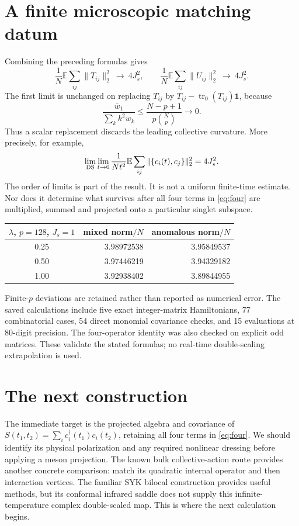 \documentclass[11pt,a4paper]{article}
\newcommand{\trn}{\operatorname{tr}_0}
\newcommand{\EE}{\mathbb E}
\begin{document}
\newpage
\section{A finite microscopic matching datum}
Combining the preceding formulas gives
\begin{equation}\label{eq:limits}
 \frac1N\EE\sum_{ij}\|T_{ij}\|_2^2\ \longrightarrow\ 4J_s^2,
 \qquad
 \frac1N\EE\sum_{ij}\|U_{ij}\|_2^2\ \longrightarrow\ 4J_s^2.
\end{equation}
The first limit is unchanged on replacing $T_{ij}$ by
$T_{ij}-\trn(T_{ij})\mathbf1$, because
\begin{equation}
 \frac{\overline w_1}{\sum_k k^2\overline w_k}
 \leq\frac{N-p+1}{p\binom Np}\longrightarrow0.
\end{equation}
Thus a scalar replacement discards the leading collective curvature.
More precisely, for example,
\begin{equation}
 \lim_{\rm DS}\lim_{t\to0}\frac1{Nt^2}
 \EE\sum_{ij}\|\{c_i(t),c_j\}\|_2^2=4J_s^2.
\end{equation}
The order of limits is part of the result. It is not a uniform
finite-time estimate. Nor does it determine what survives after all
four terms in \eqref{eq:four} are multiplied, summed and projected
onto a particular singlet subspace.

\begin{center}
\begin{tabular}{crr}
\toprule
$\lambda$, $p=128$, $J_s=1$ & mixed norm$/N$ & anomalous norm$/N$\\
\midrule
0.25 & 3.98972538 & 3.95849537\\
0.50 & 3.97446219 & 3.94329182\\
1.00 & 3.92938402 & 3.89844955\\
\bottomrule
\end{tabular}
\end{center}
Finite-$p$ deviations are retained rather than reported as numerical
error. The saved calculations include five exact integer-matrix
Hamiltonians, 77 combinatorial cases, 54 direct monomial covariance
checks, and 15 evaluations at 80-digit precision. The four-operator
identity was also checked on explicit odd matrices. These validate
the stated formulas; no real-time double-scaling extrapolation is used.

\section{The next construction}
The immediate target is the projected algebra and covariance of
$S(t_1,t_2)=\sum_i c_i^\dagger(t_1)c_i(t_2)$, retaining all four
terms in \eqref{eq:four}. We should identify its physical polarization
and any required nonlinear dressing before applying a meson
projection. The known bulk collective-action route \cite{CDP}
provides another concrete comparison: match its quadratic internal
operator and then interaction vertices. The familiar SYK bilocal
construction \cite{JSY} provides useful methods, but its conformal
infrared saddle does not supply this infinite-temperature complex
double-scaled map. This is where the next calculation begins.
\end{document}
